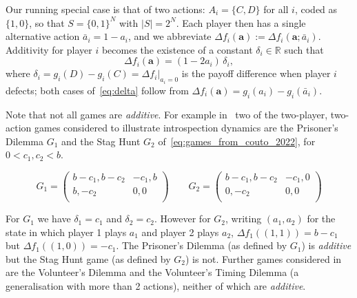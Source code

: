\documentclass[11pt]{article}
\newcommand{\bfa}{\mathbf{a}}
\begin{document}
Our running special case is that of two actions: \(A_i=\{C,D\}\) for all \(i\), coded as
\(\{1,0\}\), so that \(S=\{0,1\}^N\) with \(|S|=2^N\). Each player then has a
single alternative action \(\bar{a}_i=1-a_i\), and we abbreviate
\(\Delta f_i(\bfa):=\Delta f_i(\bfa;\bar{a}_i)\). Additivity for player \(i\)
becomes the existence of a constant \(\delta_i\in\mathbb{R}\) such that
\begin{equation}\label{eq:delta}
  \Delta f_i(\bfa) = (1-2a_i)\,\delta_i,
\end{equation}
where \(\delta_i = g_i(D)-g_i(C) = \Delta f_i\!\big|_{a_i=0}\) is the payoff
difference when player \(i\) defects; both cases of~\eqref{eq:delta} follow
from \(\Delta f_i(\bfa)=g_i(a_i)-g_i(\bar{a}_i)\).

Note that not all games are \emph{additive}. For
example in~\cite{couto2022introspection} two of the two-player, two-action games
considered to illustrate introspection dynamics are the Prisoner's Dilemma \(G_1\) and
the Stag Hunt \(G_2\) of~\eqref{eq:games_from_couto_2022}, for \(0 < c_1, c_2 < b\).

\begin{equation}\label{eq:games_from_couto_2022}
    G_1 = \begin{pmatrix}
        b - c_1, b - c_2 & - c_1, b\\
        b, - c_2 & 0, 0\\
    \end{pmatrix}
    \qquad
    G_2 = \begin{pmatrix}
        b - c_1, b - c_2 & - c_1, 0\\
        0, - c_2 & 0, 0\\
    \end{pmatrix}
\end{equation}

For \(G_1\) we have \(\delta_1=c_1\) and \(\delta_2=c_2\). However for \(G_2\),
writing \((a_1, a_2)\) for the state in which player 1 plays \(a_1\) and player
2 plays \(a_2\), \(\Delta f_1((1, 1)) = b-c_1\) but
\(\Delta f_1((1, 0)) = -c_1\). The Prisoner's Dilemma
(as defined by \(G_1\)) is \emph{additive} but the Stag Hunt game (as
defined by \(G_2\)) is not. Further games considered
in~\cite{couto2022introspection} are the Volunteer's Dilemma and the Volunteer's
Timing Dilemma (a generalisation with more than 2 actions), neither of which
are \emph{additive}.
\end{document}
